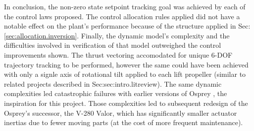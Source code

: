 \par
In conclusion, the non-zero state setpoint tracking goal was achieved by each of the control laws proposed. The control allocation rules applied did not have a notable effect on the plant's performance because of the structure applied in Sec:\ref{sec:allocation.inversion}. Finally, the dynamic model's complexity and the difficulties involved in verification of that model outweighed the control improvements shown. The thrust vectoring accomodated for unique 6-DOF trajectory tracking to be performed, however the same could have been achieved with only a signle axis of rotational tilt applied to each lift propeller (similar to related projects described in Sec:{sec:intro.litreview}). The same dynamic complexities led catastrophic failures with earlier versions of Osprey \cite{ospreywired}, the inspiration for this project. Those complexities led to subsequent redesign of the Osprey's successor, the V-280 Valor, which has significantly smaller actuator inertias due to fewer moving parts (at the cost of more frequent maintenance).